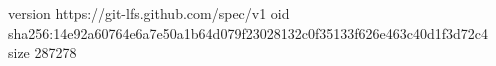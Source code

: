 version https://git-lfs.github.com/spec/v1
oid sha256:14e92a60764e6a7e50a1b64d079f23028132c0f35133f626e463c40d1f3d72c4
size 287278

